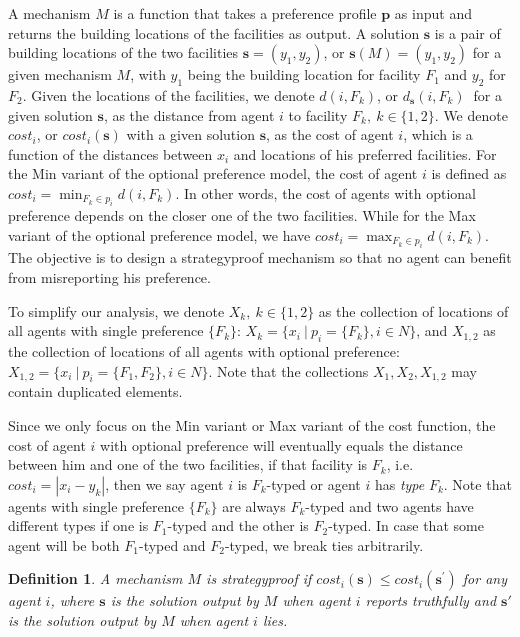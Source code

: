 \documentclass[twoside,11pt]{article}
\newtheorem{definition}{Definition}
\newcommand{\bd}{\mathbf}
\begin{document}
A mechanism $M$ is a function that takes a preference profile $\bd{p}$ as input and returns the building locations of the facilities as output.
A solution $\bd{s}$ is a pair of building locations of the two facilities $\bd{s}= (y_1, y_2)$, or $\bd{s} (M)= (y_1, y_2)$ for a given mechanism $M$, with $y_1$ being the building location for facility $F_1$ and $y_2$ for $F_2$.
Given the locations of the facilities, we denote $d (i, F_{k})$, or $d_{\bd{s}} (i, F_{k}) ~ $ for a given solution $\bd{s}$, as the distance from agent $i$ to facility $F_{k},~k \in \{1, 2\}$.
We denote $cost_i$, or $cost_i (\bd{s})$ with a given solution $\bd{s}$, as the  cost of agent $i$, which is a function of the distances between $x_i$ and locations of his preferred facilities.
%
For the Min variant of the optional preference model, the cost of agent $i$ is defined  as $cost_{i} = \min_{F_{k} \in p_{i}} d (i, F_{k})$. In other words, the cost of agents with optional preference depends on the closer one of the two facilities.
While for the Max variant of the optional preference model,
we have $cost_{i}=\max_{F_k \in p_{i}} d (i, F_{k})$.
The objective is to design a strategyproof mechanism so that no agent can benefit from misreporting his preference.

To simplify our analysis, we denote $X_{k},~k \in \{1,2\}$ as the collection of locations of all agents with single preference $\{F_{k}\}$: $X_{k} = \{x_{i}~|~p_{i}=\{F_{k}\}, i \in N \}$, and $X_{1, 2}$ as the collection of locations of all agents with optional preference: $X_{1, 2} = \{x_{i}~|~p_{i} = \{F_{1}, F_{2}\}, i \in N \}$.
Note that the collections $X_1,X_2,X_{1,2}$ may contain duplicated elements.
%

Since we only focus on the Min variant or Max variant of the cost function, the cost of agent $i$ with optional preference will eventually equals the distance between him and one of the two facilities, if that facility is $F_k$, i.e. $cost_i = |x_i-y_k|$, then we say agent $i$ is $F_k$-typed or agent $i$ has \emph{type} $F_k$.
Note that agents with single preference $\{F_k\}$ are always $F_k$-typed and two agents have different types if one is $F_1$-typed and the other is $F_2$-typed.
In case that some agent will be both $F_1$-typed and $F_2$-typed, we break ties arbitrarily.


\begin{definition}
A mechanism $M$ is strategyproof if $cost_{i} (\bd{s}) \leq cost_{i} (\bd{s}^{'})$ for any agent $i$, where $\bd{s}$ is the solution output by $M$ when agent $i$ reports truthfully and $\bd{s'}$ is the solution output by $M$ when agent $i$ lies.
\end{definition}
\end{document}
